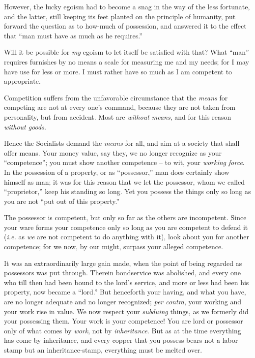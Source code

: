 \documentclass[12pt,a4paper]{book}
\begin{document}
However, the lucky egoism had to become a snag in the way of the less 
fortunate, and the latter, still keeping its feet planted on the principle of 
humanity, put forward the question as to how-much of possession, and answered 
it to the effect that ``man must have as much as he requires.''

Will it be possible for \textit{my} egoism to let itself be satisfied with 
that? What ``man'' requires furnishes by no means a scale for measuring me 
and my needs; for I may have use for less or more. I must rather have so much 
as I am competent to appropriate.

Competition suffers from the unfavorable circumstance that the \textit{means} 
for competing are not at every one's command, because they are not taken from 
personality, but from accident. Most are \textit{without means}, and for this 
reason \textit{without goods}.

Hence the Socialists demand the \textit{means} for all, and aim at a society 
that shall offer means. Your money value, say they, we no longer recognize as 
your ``competence''; you must show another competence -- to wit, your 
\textit{working force}. In the possession of a property, or as 
``possessor,'' man does certainly show himself as man; it was for this 
reason that we let the possessor, whom we called ``proprietor,'' keep his 
standing so long. Yet you possess the things only so long as you are not 
``put out of this property.''

The possessor is competent, but only so far as the others are incompetent. 
Since your ware forms your competence only so long as you are competent to 
defend it (\textit{i.e.} as \textit{we} are not competent to do anything with 
it), look about you for another competence; for we now, by our might, surpass 
your alleged competence.

It was an extraordinarily large gain made, when the point of being regarded as 
possessors was put through. Therein bondservice was abolished, and every one 
who till then had been bound to the lord's service, and more or less had been 
his property, now became a ``lord.'' But henceforth your having, and what 
you have, are no longer adequate and no longer recognized; \textit{per 
contra}, your working and your work rise in value. We now respect your 
\textit{subduing} things, as we formerly did your possessing them. Your work 
is your competence! You are lord or possessor only of what comes by 
\textit{work}, not by \textit{inheritance}. But as at the time everything has 
come by inheritance, and every copper that you possess bears not a labor-stamp 
but an inheritance-stamp, everything must be melted over.
\end{document}
